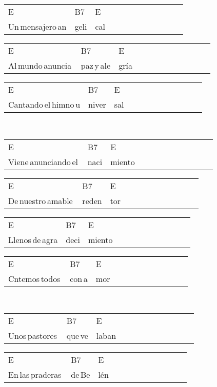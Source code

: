 \begin{multicols}{2}
\begin{minipage}{\columnwidth}
\noindent
\begin{tabular}{llllllllllll}
E&B7&E\\
Un\,mensajero\,an&geli&cal
\end{tabular}

\noindent
\begin{tabular}{llllllllllll}
E&B7&E\\
Al\,mundo\,anuncia\,&paz\,y\,ale&gría
\end{tabular}

\noindent
\begin{tabular}{llllllllllll}
E&B7&E\\
Cantando\,el\,himno\,u&niver&sal
\end{tabular}
\end{minipage}\\


\chorus{}

\noindent
\begin{minipage}{\columnwidth}
\noindent
\noindent
\begin{tabular}{llllllllllll}
E&B7&E\\
Viene\,anunciando\,el\,&naci&miento
\end{tabular}

\noindent
\begin{tabular}{llllllllllll}
E&B7&E\\
De\,nuestro\,amable\,&reden&tor
\end{tabular}

\noindent
\begin{tabular}{llllllllllll}
E&B7&E\\
Llenos\,de\,agra&deci&miento
\end{tabular}

\noindent
\begin{tabular}{llllllllllll}
E&B7&E\\
Cntemos\,todos\,&con\,a&mor
\end{tabular}
\end{minipage}\\


\chorus{}

\noindent
\begin{minipage}{\columnwidth}
\noindent
\noindent
\begin{tabular}{llllllllllll}
E&B7&E\\
Unos\,pastores\,&que\,ve&laban
\end{tabular}

\noindent
\begin{tabular}{llllllllllll}
E&B7&E\\
En\,las\,praderas\,&de\,Be&lén
\end{tabular}


\end{minipage}
\end{multicols}
